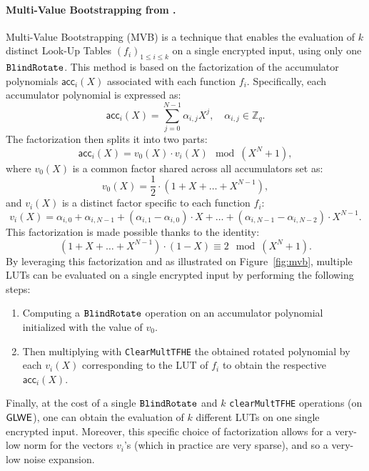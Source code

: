 \paragraph{Multi-Value Bootstrapping from \cite{RSA:CarIzaMol19}.}
\label{primitive:mvb}
%
Multi-Value Bootstrapping (MVB) is a technique that enables the evaluation of $k$ distinct Look-Up Tables $(f_i)_{1 \le i \le k}$ on a single encrypted input, using only one $\texttt{BlindRotate}$. This method is based on the factorization of the accumulator polynomials $\textsf{acc}_i(X)$ associated with each function $f_i$. Specifically, each accumulator polynomial is expressed as: 
$$
    \textsf{acc}_i(X) = \sum_{j=0}^{N-1} \alpha_{i,j} X^j, \quad \alpha_{i,j} \in \mathbb{Z}_q.
$$
The factorization then splits it into two parts: 
$$
    \textsf{acc}_i(X) = v_0(X) \cdot v_i(X) \mod (X^N + 1),
$$
where $v_0(X)$ is a common factor shared across all accumulators set as:
$$
    v_0(X) = \frac{1}{2} \cdot (1 + X + \dots + X^{N-1}),
$$
and $v_i(X)$ is a distinct factor specific to each function $f_i$:
$$
    v_i(X) = \alpha_{i, 0} + \alpha_{i, N-1} + (\alpha_{i, 1} - \alpha_{i, 0}) \cdot X + \dots + (\alpha_{i, N-1} - \alpha_{i, N-2}) \cdot X^{N-1}.
$$
This factorization is made possible thanks to the identity:
$$
(1 + X + \dots + X^{N-1}) \cdot (1-X) \equiv 2 \mod (X^N + 1).
$$
By leveraging this factorization and as illustrated on Figure~\ref{fig:mvb}, multiple LUTs can be evaluated on a single encrypted input by performing the following steps:
\begin{enumerate}
\item Computing a $\texttt{BlindRotate}$ operation on an accumulator polynomial initialized with the value of $v_0$.
\item Then multiplying with \texttt{ClearMultTFHE} the obtained rotated polynomial by each $v_i(X)$ corresponding to the LUT of $f_i$ to obtain the respective $\textsf{acc}_i(X)$.
\end{enumerate}
Finally, at the cost of a single $\texttt{BlindRotate}$ and $k$ \texttt{clearMultTFHE} operations (on $\textsf{GLWE}$), one can obtain the evaluation of $k$ different LUTs on one single encrypted input. Moreover, this specific choice of factorization allows for a very-low norm for the vectors $v_i$'s (which in practice are very sparse), and so a very-low noise expansion.

